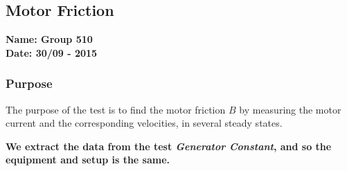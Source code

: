 \pagebreak
\subsection{Motor Friction} %
\textbf{Name: Group 510}\\
\textbf{Date: 30/09 - 2015}

\subsubsection{Purpose}
The purpose of the test is to find the motor friction $B$ by measuring the motor current and the corresponding velocities, in several steady states.

\textbf{We extract the data from the test \textit{Generator Constant}, and so the equipment and setup is the same.}

